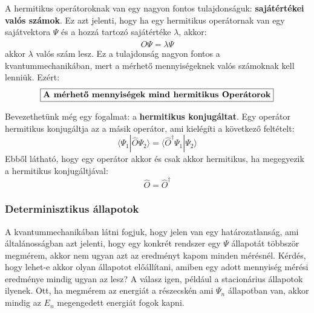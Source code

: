 \documentclass[../main.tex]{subfiles}
\begin{document}
A hermitikus operátoroknak van egy nagyon fontos tulajdonságuk: \textbf{sajátértékei valós számok}. Ez azt jelenti, hogy ha egy hermitikus operátornak van egy sajátvektora $\Psi$ és a hozzá tartozó sajátértéke $\lambda$, akkor:
\begin{equation}
    \hat{O} \Psi = \lambda \Psi
\end{equation}
akkor $\lambda$ valós szám lesz. Ez a tulajdonság nagyon fontos a kvantummechanikában, mert a mérhető mennyiségeknek valós számoknak kell lenniük. Ezért:
\begin{equation}
    \boxed{\text{\textbf{A mérhető mennyiségek mind hermitikus Operátorok}}}
\end{equation}

Bevezethetünk még egy fogalmat: a \textbf{hermitikus konjugáltat}. Egy operátor hermitikus konjugáltja az a másik operátor, ami kielégíti a következő feltételt:
\begin{equation}
    \langle \Psi_1 | \hat{O} \Psi_2 \rangle = \langle \hat{O}^\dagger \Psi_1 | \Psi_2 \rangle
\end{equation}
Ebből látható, hogy egy operátor akkor és csak akkor hermitikus, ha megegyezik a hermitikus konjugáltjával:
\begin{equation}
    \hat{O} = \hat{O}^\dagger
\end{equation}

\subsubsection{Determinisztikus állapotok}
A kvantummechanikában látni fogjuk, hogy jelen van egy határozatlanság, ami általánosságban azt jelenti, hogy egy konkrét rendszer egy $\Psi$ állapotát többször megmérem, akkor nem ugyan azt az eredményt kapom minden mérésnél.
Kérdés, hogy lehet-e akkor olyan állapotot előállítani, amiben egy adott mennyiség mérési eredménye mindig ugyan az lesz? A válasz igen, például a stacionárius állapotok ilyenek. Ott, ha megmérem az energiát a részecskén ami $\Psi_n$ állapotban van,
akkor mindig az $E_n$ megengedett energiát fogok kapni. 
\end{document}
